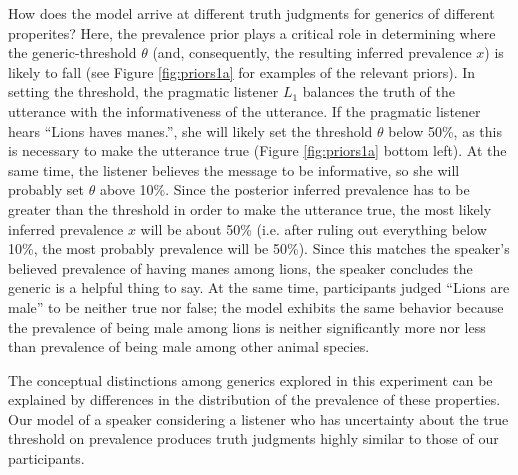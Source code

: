 \documentclass[10pt,letterpaper]{article}
\begin{document}
How does the model arrive at different truth judgments for generics of different properites?
Here, the prevalence prior plays a critical role in determining where the generic-threshold $\theta$ (and, consequently, the resulting inferred prevalence $x$) is likely to fall (see Figure \ref{fig:priors1a} for examples of the relevant priors). 
In setting the threshold, the pragmatic listener $L_{1}$ balances the truth of the utterance with the informativeness of the utterance. 
If the pragmatic listener hears ``Lions haves manes.'', she will likely set the threshold $\theta$ below 50\%, as this is necessary to make the utterance true (Figure \ref{fig:priors1a} bottom left). 
At the same time, the listener believes the message to be informative, so she will probably set $\theta$ above 10\%. 
Since the posterior inferred prevalence has to be greater than the threshold in order to make the utterance true, the most likely inferred prevalence $x$ will be about 50\% (i.e. after ruling out everything below 10\%, the most probably prevalence will be 50\%). 
Since this matches the speaker's believed prevalence of having manes among lions, the speaker concludes the generic is a helpful thing to say.
At the same time, participants judged ``Lions are male'' to be neither true nor false; the model exhibits the same behavior because the prevalence of being male among lions is neither significantly more nor less than prevalence of being male among other animal species. 

The conceptual distinctions among generics \cite{Prasada2013} explored in this experiment can be explained by differences in the distribution of the prevalence of these properties. 
Our model of a speaker considering a listener who has uncertainty about the true threshold on prevalence produces truth judgments highly similar to those of our participants.

\end{document}
